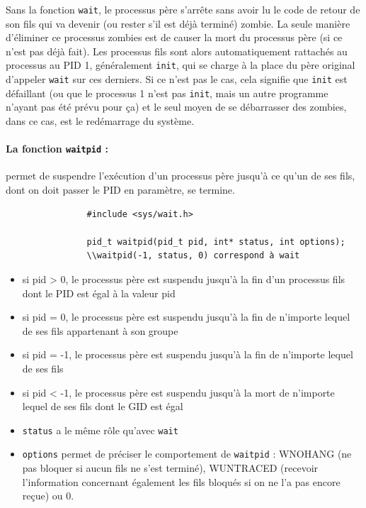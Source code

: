 			Sans la fonction \lstinline!wait!, le processus père s'arrête sans avoir lu le code de retour de son fils qui va devenir (ou rester s'il est déjà terminé) zombie. La seule manière d'éliminer ce processus zombies est de causer la mort du processus père (si ce n'est pas déjà fait). Les processus fils sont alors automatiquement rattachés au processus au PID 1, généralement \lstinline!init!, qui se charge à la place du père original d'appeler \lstinline!wait! sur ces derniers. Si ce n'est pas le cas, cela signifie que \lstinline!init! est défaillant (ou que le processus 1 n'est pas \lstinline!init!, mais un autre programme n'ayant pas été prévu pour ça) et le seul moyen de se débarrasser des zombies, dans ce cas, est le redémarrage du système.
			
			\paragraph{La fonction \lstinline!waitpid! :} permet de suspendre l'exécution d'un processus père jusqu'à ce qu'un de ses fils, dont on doit passer le PID en paramètre, se termine.
			\begin{lstlisting}
				#include <sys/wait.h>

				pid_t waitpid(pid_t pid, int* status, int options);
				\\waitpid(-1, status, 0) correspond à wait
			\end{lstlisting}
			\begin{itemize}
				\item si pid > 0, le processus père est suspendu jusqu'à la fin d'un processus fils dont le PID est égal à la valeur pid
				\item si pid = 0, le processus père est suspendu jusqu'à la fin de n'importe lequel de ses fils appartenant à son groupe
				\item si pid = -1, le processus père est suspendu jusqu'à la fin de n'importe lequel de ses fils
				\item si pid < -1, le processus père est suspendu jusqu'à la mort de n'importe lequel de ses fils dont le GID est égal
				\item \lstinline!status! a le même rôle qu'avec \lstinline!wait!
				\item \lstinline!options! permet de préciser le comportement de \lstinline!waitpid! : WNOHANG (ne pas bloquer si aucun fils ne s'est terminé), WUNTRACED (recevoir l'information concernant également les fils bloqués si on ne l'a pas encore reçue) ou 0.
			\end{itemize}
			
